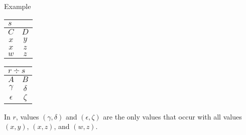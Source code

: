 \begin{multicols}{2}
\begin{CheatsheetEntryFrame}
\begin{RelAlgSubsection}{Example}
\begin{center}
{                \quad
                \begin{tabular}{|cc|}
                    \multicolumn{2}{l}{\normalsize $s$}
                        \\ \hline
                    \multicolumn{1}{|c}{$C$}
                        & \multicolumn{1}{c|}{$D$}
                    \\ \hline \hline
                    $x$ & $y$ \\
                    $x$ & $z$ \\
                    $w$ & $z$ \\ \hline
                \end{tabular}
                \qquad\quad
                \begin{tabular}{|cc|}
                    \multicolumn{2}{l}{\normalsize $r \div s$}
                        \\ \hline
                    \multicolumn{1}{|c}{$A$}
                        & \multicolumn{1}{c|}{$B$}
                        \\ \hline\hline
                    $\gamma  $ & $\delta$ \\
                    $\epsilon$ & $\zeta $ \\ \hline
                \end{tabular}
            }
        \end{center}
        \medskip
        {\footnotesize%
            In $r$, values $(\gamma, \delta)$ and $(\epsilon, \zeta)$ are the only values that occur with all values $(x, y)$, $(x, z)$, and $(w, z)$.
        }
        \end{RelAlgSubsection}

    \end{CheatsheetEntryFrame}

    \begin{CheatsheetEntryFrame}


\end{CheatsheetEntryFrame}
\end{multicols}
